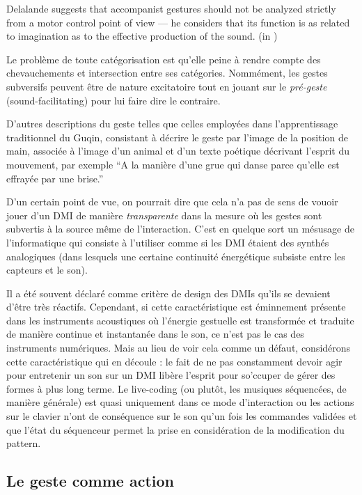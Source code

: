 Delalande suggests that accompanist gestures should not be analyzed strictly from a motor control point of view — he considers that its function is as related to imagination as to the effective production of the sound. (in \cite{cadoz_gesture_2000})

Le problème de toute catégorisation est qu'elle peine à rendre compte des chevauchements et intersection entre ses catégories. Nommément, les gestes subversifs peuvent être de nature excitatoire tout en jouant sur le \textit{pré-geste} (sound-facilitating) pour lui faire dire le contraire.

D'autres descriptions du geste telles que celles employées dans l'apprentissage traditionnel du Guqin, consistant à décrire le geste par l'image de la position de main, associée à l'image d'un animal et d'un texte poétique décrivant l'esprit du mouvement, par exemple ``A la manière d'une grue qui danse parce qu'elle est effrayée par une brise.''

D'un certain point de vue, on pourrait dire que cela n'a pas de sens de vouoir jouer d'un DMI de manière \textit{transparente} dans la mesure où les gestes sont subvertis à la source même de l'interaction. C'est en quelque sort un mésusage de l'informatique qui consiste à l'utiliser comme si les DMI étaient des synthés analogiques (dans lesquels une certaine continuité énergétique subsiste entre les capteurs et le son).


Il a été souvent déclaré comme critère de design des DMIs qu'ils se devaient d'être très réactifs. Cependant, si cette caractéristique est éminnement présente dans les instruments acoustiques où l'énergie gestuelle est transformée et traduite de manière continue et instantanée dans le son, ce n'est pas le cas des instruments numériques. Mais au lieu de voir cela comme un défaut, considérons cette caractéristique qui en découle :  le fait de ne pas constamment devoir agir pour entretenir un son sur un DMI libère l'esprit pour so'ccuper de gérer des formes à plus long terme. Le live-coding (ou plutôt, les musiques séquencées, de manière générale) est quasi uniquement dans ce mode d'interaction ou les actions sur le clavier n'ont de conséquence sur le son qu'un fois les commandes validées et que l'état du séquenceur permet la prise en considération de la modification du pattern.


\subsection{Le geste comme action}


